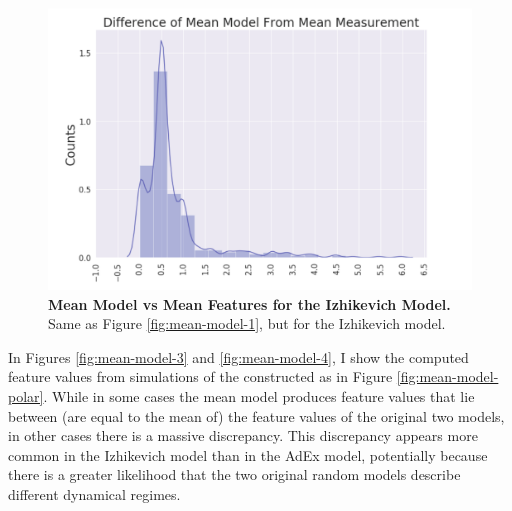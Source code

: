 \begin{figure}
    \centering
    \includegraphics{figures/reproduced_izhi.png}
    \caption[Mean Model Versus Mean Features for Izhikevich Model]{\textbf{Mean Model vs Mean Features for the Izhikevich Model.} Same as Figure \ref{fig:mean-model-1}, but for the Izhikevich model.}
    \label{fig:mean-model-2}
\end{figure}




In Figures \ref{fig:mean-model-3} and \ref{fig:mean-model-4}, I show the computed feature values from simulations of the constructed as in Figure \ref{fig:mean-model-polar}.
While in some cases the mean model produces feature values that lie between (are equal to the mean of) the feature values of the original two models, in other cases there is a massive discrepancy.
This discrepancy appears more common in the Izhikevich model than in the AdEx model, potentially because there is a greater likelihood that the two original random models describe different dynamical regimes.

